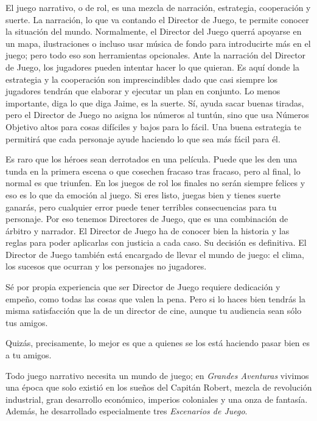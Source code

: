 El juego narrativo, o de rol, es una mezcla de narración, estrategia, cooperación y suerte. La narración, lo que va contando el Director de Juego, te permite conocer la situación del mundo. Normalmente, el Director del Juego querrá apoyarse en un mapa, ilustraciones o incluso usar música de fondo para introducirte más en el juego; pero todo eso son herramientas opcionales. Ante la narración del Director de Juego, los jugadores pueden intentar hacer lo que quieran. Es aquí donde la estrategia y la cooperación son imprescindibles dado que casi siempre los jugadores tendrán que elaborar y ejecutar un plan en conjunto. Lo menos importante, diga lo que diga Jaime, es la suerte. Sí, ayuda sacar buenas tiradas, pero el Director de Juego no asigna los números al tuntún, sino que usa Números Objetivo altos para cosas difíciles y bajos para lo fácil. Una buena estrategia te permitirá que cada personaje ayude haciendo lo que sea más fácil para él.

Es raro que los héroes sean derrotados en una película. Puede que les den una tunda en la primera escena o que cosechen fracaso tras fracaso, pero al final, lo normal es que triunfen. En los juegos de rol los finales no serán siempre felices y eso es lo que da emoción al juego. Si eres listo, juegas bien y tienes suerte ganarás, pero cualquier error puede tener terribles consecuencias para tu personaje.
Por eso tenemos Directores de Juego, que es una combinación de árbitro y narrador. El Director de Juego ha de conocer bien la historia y las reglas para poder aplicarlas con justicia a cada caso. Su decisión es definitiva. El Director de Juego también está encargado de llevar el mundo de juego: el clima, los sucesos que ocurran y los personajes no jugadores.

Sé por propia experiencia que ser Director de Juego requiere dedicación y empeño, como todas las cosas que valen la pena. Pero si lo haces bien tendrás la misma satisfacción que la de un director de cine, aunque tu audiencia sean sólo tus amigos.

Quizás, precisamente, lo mejor es que a quienes se los está haciendo pasar bien es a tu amigos.


Todo juego narrativo necesita un mundo de juego; en \emph{Grandes Aventuras} vivimos una época que solo existió en los sueños del Capitán Robert, mezcla de revolución industrial, gran desarrollo económico, imperios coloniales y una onza de fantasía. Además, he desarrollado especialmente tres \emph{Escenarios de Juego}. 

